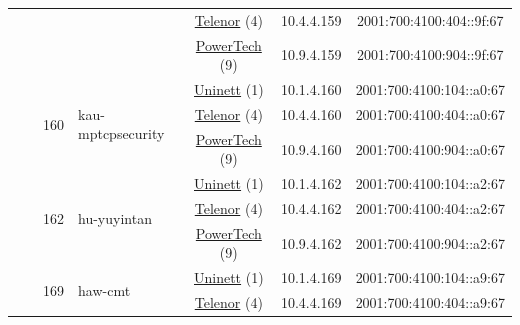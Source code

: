 \begin{small}
\begin{center}
\begin{longtable}{|c|c|c|c|c|c|c|c|}
  &  &  &  & \multicolumn{2}{|c|}{\tiny{\href{https://www.telenor.no}{Telenor} (4)}} & \tiny{10.4.4.159} & \tiny{2001:700:4100:404::9f:67} \\* \cline{5-5}\cline{6-6}\cline{7-7}\cline{8-8}
  &  &  &  & \multicolumn{2}{|c|}{\tiny{\href{http://www.powertech.no}{PowerTech} (9)}} & \tiny{10.9.4.159} & \tiny{2001:700:4100:904::9f:67} \\* \cline{3-3}\cline{4-4}\cline{5-5}\cline{6-6}\cline{7-7}\cline{8-8}
  &  & \multirow{3}{*}{\tiny{160}} & \multicolumn{1}{|l|}{\multirow{3}{*}{\tiny{kau-mptcpsecurity}}} & \multicolumn{2}{|c|}{\tiny{\href{https://www.uninett.no}{Uninett} (1)}} & \tiny{10.1.4.160} & \tiny{2001:700:4100:104::a0:67} \\* \cline{5-5}\cline{6-6}\cline{7-7}\cline{8-8}
  &  &  &  & \multicolumn{2}{|c|}{\tiny{\href{https://www.telenor.no}{Telenor} (4)}} & \tiny{10.4.4.160} & \tiny{2001:700:4100:404::a0:67} \\* \cline{5-5}\cline{6-6}\cline{7-7}\cline{8-8}
  &  &  &  & \multicolumn{2}{|c|}{\tiny{\href{http://www.powertech.no}{PowerTech} (9)}} & \tiny{10.9.4.160} & \tiny{2001:700:4100:904::a0:67} \\* \cline{3-3}\cline{4-4}\cline{5-5}\cline{6-6}\cline{7-7}\cline{8-8}
  &  & \multirow{3}{*}{\tiny{162}} & \multicolumn{1}{|l|}{\multirow{3}{*}{\tiny{hu-yuyintan}}} & \multicolumn{2}{|c|}{\tiny{\href{https://www.uninett.no}{Uninett} (1)}} & \tiny{10.1.4.162} & \tiny{2001:700:4100:104::a2:67} \\* \cline{5-5}\cline{6-6}\cline{7-7}\cline{8-8}
  &  &  &  & \multicolumn{2}{|c|}{\tiny{\href{https://www.telenor.no}{Telenor} (4)}} & \tiny{10.4.4.162} & \tiny{2001:700:4100:404::a2:67} \\* \cline{5-5}\cline{6-6}\cline{7-7}\cline{8-8}
  &  &  &  & \multicolumn{2}{|c|}{\tiny{\href{http://www.powertech.no}{PowerTech} (9)}} & \tiny{10.9.4.162} & \tiny{2001:700:4100:904::a2:67} \\* \cline{3-3}\cline{4-4}\cline{5-5}\cline{6-6}\cline{7-7}\cline{8-8}
  &  & \multirow{3}{*}{\tiny{169}} & \multicolumn{1}{|l|}{\multirow{3}{*}{\tiny{haw-cmt}}} & \multicolumn{2}{|c|}{\tiny{\href{https://www.uninett.no}{Uninett} (1)}} & \tiny{10.1.4.169} & \tiny{2001:700:4100:104::a9:67} \\* \cline{5-5}\cline{6-6}\cline{7-7}\cline{8-8}
  &  &  &  & \multicolumn{2}{|c|}{\tiny{\href{https://www.telenor.no}{Telenor} (4)}} & \tiny{10.4.4.169} & \tiny{2001:700:4100:404::a9:67} \\* \cline{5-5}\cline{6-6}\cline{7-7}\cline{8-8}

\end{longtable}
\end{center}
\end{small}
